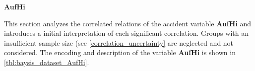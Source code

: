 \Large
\centerline{\textbf{AufHi}}
\normalsize
This section analyzes the correlated relations of the accident variable \textbf{AufHi} and introduces a initial interpretation of each significant correlation. Groups with an insufficient sample size (see \cref{correlation_uncertainty} are neglected and not considered. The encoding and description of the variable \textbf{AufHi} is shown in \cref{tbl:baysis_dataset_AufHi}.

